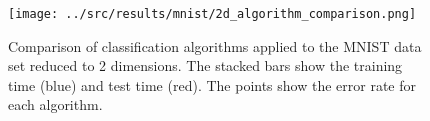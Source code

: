 \begin{figure}[H]
    \texttt{[image: ../src/results/mnist/2d\_algorithm\_comparison.png]}
    \caption{Comparison of classification algorithms  applied to the MNIST data set reduced to 2 dimensions. The stacked bars show the training time (blue) and test time (red). The points show the error rate for each algorithm.}
    \label{fig:comparison_mnist_2d}
\end{figure}